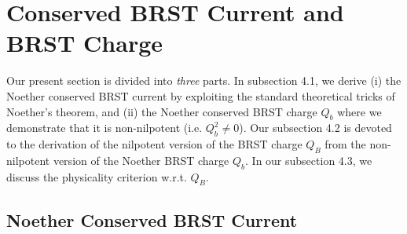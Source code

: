 \documentclass[12pt]{article}
\begin{document}


\section{Conserved BRST Current and  BRST Charge}



Our present section is divided into {\it three} parts. In subsection 4.1, we derive (i) the Noether conserved BRST current by exploiting the standard 
theoretical tricks of Noether's theorem, and (ii) the Noether conserved  BRST charge $Q_b$ where we demonstrate that it is non-nilpotent
(i.e. $Q_b^2 \neq 0$).
Our subsection 4.2 is devoted to the derivation of the nilpotent version of the BRST charge $Q_B $ from the 
non-nilpotent version of the Noether BRST charge $Q_b$.
In our subsection 4.3, we discuss the physicality criterion w.r.t. $Q_B$.\\ 


\vskip 0.7cm


\subsection{Noether  Conserved BRST Current}
\end{document}
